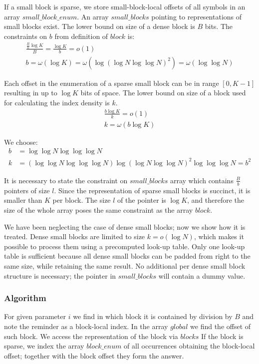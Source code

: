 If a small block is sparse, we store small-block-local offsets of all symbols \ph{} in an array $small\_block\_enum$.
An array $small\_blocks$ pointing to representations of small blocks exist.
The lower bound on size of a dense block is $B$ bits.
The constraints on $b$ from definition of $block$ is:
\begin{gather*}
\frac{\frac{B}{b} \log K}{B} = \frac{\log K}{b} = o(1) \\
b = \omega(\log K) = \omega(\log(\log N \log \log N)^2) = \omega(\log \log N)
\end{gather*}

Each offset in the enumeration of a sparse small block can be in range $[0, K-1]$ resulting in up to $\log K$ bits of space.
The lower bound on size of a block used for calculating the index density is $k$.
\begin{gather*}
\frac{b \log K}{k} = o(1) \\
k = \omega(b\log K)
\end{gather*}

We choose:
\begin{align*}
b &= \log \log N \log \log \log N \\
k &= (\log \log N \log \log \log N) \log(\log N \log \log N)^2 \log \log \log N = b^2
\end{align*}

It is necessary to state the constraint on $small\_blocks$ array which contains $\frac{B}{b}$ pointers of size $l$.
Since the representation of sparse small blocks is succinct, it is smaller than $K$ per block.
The size $l$ of the pointer is $\log K$, and therefore the size of the whole array poses the same constraint as the array $block$.

We have been neglecting the case of dense small blocks; now we show how it is treated.
Dense small blocks are limited to size $k = o(\log N)$, which makes it possible to process them using a precomputed look-up table.
Only one look-up table is sufficient because all dense small blocks can be padded from right to the same size, while retaining the same result.
No additional per dense small block structure is necessary; the pointer in $small\_blocks$ will contain a dummy value.

\subsubsection{Algorithm}

For given parameter $i$ we find in which block it is contained by division by $B$ and note the reminder as a block-local index.
In the array $global$ we find the offset of such block.
We access the representation of the block via $blocks$
If the block is sparse, we index the array $block\_enum$ of all occurrences obtaining the block-local offset; together with the block offset they form the answer.

